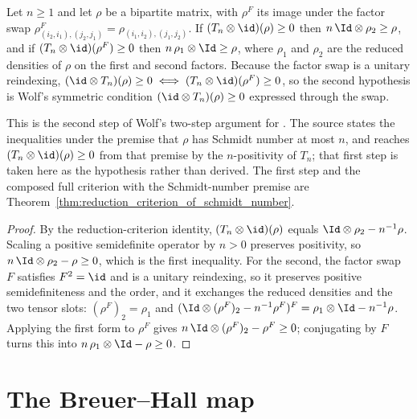 \begin{theorem}
    \label{thm:reduction_criterion}
    \leanok
    Let $n\ge 1$ and let $\rho$ be a bipartite matrix, with $\rho^{F}$ its image
    under the factor swap $\rho^{F}_{(i_2,i_1),(j_2,j_1)}=\rho_{(i_1,i_2),(j_1,j_2)}$.
    If $(T_n\otimes\id)(\rho)\ge0$ then
    $n\,\Id\otimes\rho_2\ge\rho$, and if
    $(T_n\otimes\id)(\rho^{F})\ge0$ then
    $n\,\rho_1\otimes\Id\ge\rho$, where $\rho_1$ and $\rho_2$ are the reduced
    densities of $\rho$ on the first and second factors. Because the factor
    swap is a unitary reindexing,
    $(\id\otimes T_n)(\rho)\ge0
        \iff(T_n\otimes\id)(\rho^{F})\ge0$, so the second hypothesis is Wolf's
    symmetric condition
    $(\id\otimes T_n)(\rho)\ge0$ expressed through the swap.

    This is the second step of Wolf's two-step argument for
    \cite[Equation~(3.18)]{Wolf2012Quantum}. The source states the inequalities
    under the premise that $\rho$ has Schmidt number at most $n$, and reaches
    $(T_n\otimes\id)(\rho)\ge0$ from that premise by the $n$-positivity of
    $T_n$; that first step is taken here as the hypothesis rather than derived.
    The first step and the composed full criterion with the Schmidt-number
    premise are
    Theorem~\ref{thm:reduction_criterion_of_schmidt_number}.
\end{theorem}

\begin{proof}
    \leanok
    By the reduction-criterion identity, $(T_n\otimes\id)(\rho)$ equals
    $\Id\otimes\rho_2-n^{-1}\rho$. Scaling a positive semidefinite operator by
    $n>0$ preserves positivity, so $n\,\Id\otimes\rho_2-\rho\ge0$, which is the
    first inequality. For the second, the factor swap $F$ satisfies $F^2=\id$
    and is a unitary reindexing, so it preserves positive semidefiniteness and
    the order, and it exchanges the reduced densities and the two tensor slots:
    $(\rho^{F})_2=\rho_1$ and
    $(\Id\otimes(\rho^{F})_2-n^{-1}\rho^{F})^{F}
        =\rho_1\otimes\Id-n^{-1}\rho$.
    Applying the first form to $\rho^{F}$ gives
    $n\,\Id\otimes(\rho^{F})_2-\rho^{F}\ge0$; conjugating by $F$ turns this into
    $n\,\rho_1\otimes\Id-\rho\ge0$.
\end{proof}

\section{The Breuer--Hall map}

